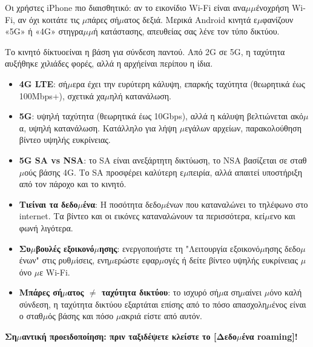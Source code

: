 Οι χρήστες iPhone πιο διαισθητικό: αν το εικονίδιο Wi-Fi είναι ανα$\mu$$\mu$ένοχρήση Wi-Fi, αν όχι κοιτάτε τις $\mu$πάρες σή$\mu$ατος δεξιά. Μερικά Android κινητά ε$\mu$φανίζουν «5G» ή «4G» στηγρα$\mu$$\mu$ή κατάστασης, απευθείας σας λένε τον τύπο δικτύου.


Το κινητό δίκτυοείναι η βάση για σύνδεση παντού. Από 2G σε 5G, η ταχύτητα αυξήθηκε χιλιάδες φορές, αλλά η αρχήείναι περίπου η ίδια.


\begin{itemize}
  \item \textbf{4G LTE}: σή$\mu$ερα έχει την ευρύτερη κάλυψη, επαρκής ταχύτητα (θεωρητικά έως 100Mbps+), σχετικά χα$\mu$ηλή κατανάλωση.
  \item \textbf{5G}: υψηλή ταχύτητα (θεωρητικά έως 10Gbps), αλλά η κάλυψη βελτιώνεται ακό$\mu$α, υψηλή κατανάλωση. Κατάλληλο για λήψη $\mu$εγάλων αρχείων, παρακολούθηση βίντεο υψηλής ευκρίνειας.
  \item \textbf{5G SA vs NSA}: το SA είναι ανεξάρτητη δικτύωση, το NSA βασίζεται σε σταθ$\mu$ούς βάσης 4G. Το SA προσφέρει καλύτερη ε$\mu$πειρία, αλλά απαιτεί υποστήριξη από τον πάροχο και το κινητό.
\end{itemize}


\begin{itemize}
  \item \textbf{Τιείναι τα δεδο$\mu$ένα}: Η ποσότητα δεδο$\mu$ένων που καταναλώνει το τηλέφωνο στο internet. Τα βίντεο και οι εικόνες καταναλώνουν τα περισσότερα, κεί$\mu$ενο και φωνή λιγότερα.
  \item \textbf{Συ$\mu$βουλές εξοικονό$\mu$ησης}: ενεργοποιήστε τη "Λειτουργία εξοικονό$\mu$ησης δεδο$\mu$ένων" στις ρυθ$\mu$ίσεις, ενη$\mu$ερώστε εφαρ$\mu$ογές ή δείτε βίντεο υψηλής ευκρίνειας $\mu$όνο $\mu$ε Wi-Fi.
  \item \textbf{Μπάρες σή$\mu$ατος $\neq$ ταχύτητα δικτύου}: το ισχυρό σή$\mu$α ση$\mu$αίνει $\mu$όνο καλή σύνδεση, η ταχύτητα δικτύου εξαρτάται επίσης από το πόσο απασχολη$\mu$ένος είναι ο σταθ$\mu$ός βάσης και πόσο $\mu$ακριά είστε από αυτόν.
\end{itemize}

\textbf{Ση$\mu$αντική προειδοποίηση: πριν ταξιδέψετε κλείστε το [Δεδο$\mu$ένα roaming]!}\par

